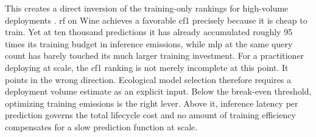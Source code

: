 This creates a direct inversion of the training-only rankings for high-volume deployments \parencite{desislavovTrendsAIInference2023}. \gls{rf} on Wine achieves a favorable \gls{cf1} precisely because it is cheap to train. Yet at ten thousand predictions it has already accumulated roughly 95 times its training budget in inference emissions, while \gls{mlp} at the same query count has barely touched its much larger training investment. For a practitioner deploying at scale, the \gls{cf1} ranking is not merely incomplete at this point. It points in the wrong direction. Ecological model selection therefore requires a deployment volume estimate as an explicit input. Below the break-even threshold, optimizing training emissions is the right lever. Above it, inference latency per prediction governs the total lifecycle cost and no amount of training efficiency compensates for a slow prediction function at scale.
